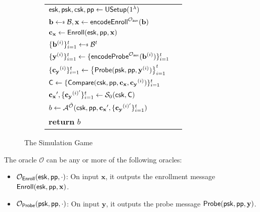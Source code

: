 \begin{figure}[h]
\begin{center}
\begin{subfigure}[t]{0.49\textwidth}
\begin{tabular}{l c}
			\hline

			${\sf esk}, {\sf psk}, {\sf csk}, {\sf pp} \gets {\sf USetup}(1^\lambda)$ \\

			$ \mathbf{b} \getsdollar \mathcal{B}, \mathbf{x} \gets {\sf encodeEnroll}^{\mathcal{O}_{\sf aux}}(\mathbf{b})$ \\

			$\mathbf{c_x} \gets {\sf Enroll}({\sf esk}, {\sf pp}, \mathbf{x})$ \\

			$\{ \mathbf{b}^{(i)} \}_{i=1}^t \getsdollar \mathcal{B}^t$ \\ 

			$\{\mathbf{y}^{(i)}\}_{i=1}^t \gets \{{\sf encodeProbe}^{\mathcal{O}_{\sf aux}}(\mathbf{b}^{(i)})\}_{i=1}^t $ \\
			
			$\{ \mathbf{c_y}^{(i)} \}_{i=1}^t \gets \left\{ {\sf Probe}( {\sf psk}, {\sf pp}, \mathbf{y}^{(i)} ) \right \}_{i=1}^t$ \\

			${\sf C} \gets \{ {\sf Compare}({\sf csk}, {\sf pp}, \mathbf{c_x}, \mathbf{c_y}^{(i)}) \}_{i=1}^t$ \\

			$\mathbf{c_x}', \{\mathbf{c_y}^{(i)'}\}_{i=1}^t \gets \mathcal{S}_0( {\sf csk}, {\sf C} )$ \\

			$b \gets \mathcal{A}^{\tilde{\mathcal{O}}} ({\sf csk}, {\sf pp}, \mathbf{c_x}', \{ \mathbf{c_y}^{(i)'} \}_{i=1}^t )$ \\

			\textbf{return} $b$
			
		\end{tabular}
		\end{subfigure}
	\end{center}
	\caption{The Simulation Game}
	\label{fig:sim_game}
\end{figure}

The oracle $\mathcal{O}$ can be any or more of the following oracles:

\begin{itemize}

	\item $\mathcal{O}_{\sf Enroll}({\sf esk}, {\sf pp}, \cdot)$: On input $\mathbf{x}$, it outputs the enrollment message ${\sf Enroll}({\sf esk}, {\sf pp}, \mathbf{x})$.

	\item $\mathcal{O}_{\sf Probe}({\sf psk}, {\sf pp}, \cdot)$: On input $\mathbf{y}$, it outputs the probe message ${\sf Probe}({\sf psk}, {\sf pp}, \mathbf{y})$.

\end{itemize}


